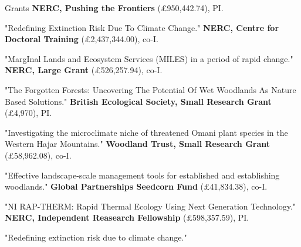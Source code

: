 \begin{rubric}{Grants}
\entry*[2023] \textbf{NERC, Pushing the Frontiers} (£950,442.74), PI.
	\par \footnotesize "Redefining Extinction Risk Due To Climate Change." \normalsize
\entry*[2023] \textbf{NERC, Centre for Doctoral Training} (£2,437,344.00), co-I.
	\par \footnotesize "MargInal Lands and Ecosystem Services (MILES) in a period of rapid change." \normalsize
\entry*[2023] \textbf{NERC, Large Grant} (£526,257.94), co-I.
	\par \footnotesize "The Forgotten Forests: Uncovering The Potential Of Wet Woodlands As Nature Based Solutions." \normalsize
\entry*[2022] \textbf{British Ecological Society, Small Research Grant} (£4,970), PI.
	\par \footnotesize "Investigating the microclimate niche of threatened Omani plant species in the Western Hajar Mountains." \normalsize
\entry*[2022] \textbf{Woodland Trust, Small Research Grant} (£58,962.08), co-I.
	\par \footnotesize "Effective landscape-scale management tools for established and establishing woodlands." \normalsize
\entry*[2022] \textbf{Global Partnerships Seedcorn Fund} (£41,834.38), co-I.
	\par \footnotesize "NI RAP-THERM: Rapid Thermal Ecology Using Next Generation Technology." \normalsize
\entry*[2020] \textbf{NERC, Independent Reasearch Fellowship} (£598,357.59), PI.
	\par \footnotesize "Redefining extinction risk due to climate change." \normalsize
\end{rubric}